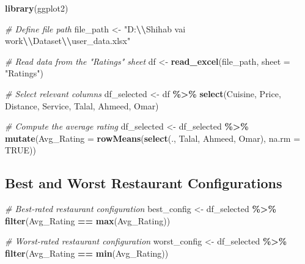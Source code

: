 \documentclass[
]{article}
\newenvironment{Shaded}{\begin{snugshade}}{\end{snugshade}}
\newcommand{\AttributeTok}[1]{\textcolor[rgb]{0.13,0.29,0.53}{#1}}
\newcommand{\CommentTok}[1]{\textcolor[rgb]{0.56,0.35,0.01}{\textit{#1}}}
\newcommand{\ConstantTok}[1]{\textcolor[rgb]{0.56,0.35,0.01}{#1}}
\newcommand{\FunctionTok}[1]{\textcolor[rgb]{0.13,0.29,0.53}{\textbf{#1}}}
\newcommand{\NormalTok}[1]{#1}
\newcommand{\OtherTok}[1]{\textcolor[rgb]{0.56,0.35,0.01}{#1}}
\newcommand{\SpecialCharTok}[1]{\textcolor[rgb]{0.81,0.36,0.00}{\textbf{#1}}}
\newcommand{\StringTok}[1]{\textcolor[rgb]{0.31,0.60,0.02}{#1}}
\begin{document}
\begin{Shaded}
\begin{Highlighting}[]
\FunctionTok{library}\NormalTok{(ggplot2)}

\CommentTok{\# Define file path}
\NormalTok{file\_path }\OtherTok{\textless{}{-}} \StringTok{"D:}\SpecialCharTok{\textbackslash{}\textbackslash{}}\StringTok{Shihab vai work}\SpecialCharTok{\textbackslash{}\textbackslash{}}\StringTok{Dataset}\SpecialCharTok{\textbackslash{}\textbackslash{}}\StringTok{user\_data.xlsx"}

\CommentTok{\# Read data from the "Ratings" sheet}
\NormalTok{df }\OtherTok{\textless{}{-}} \FunctionTok{read\_excel}\NormalTok{(file\_path, }\AttributeTok{sheet =} \StringTok{"Ratings"}\NormalTok{)}

\CommentTok{\# Select relevant columns}
\NormalTok{df\_selected }\OtherTok{\textless{}{-}}\NormalTok{ df }\SpecialCharTok{\%\textgreater{}\%} \FunctionTok{select}\NormalTok{(Cuisine, Price, Distance, Service, Talal, Ahmeed, Omar)}

\CommentTok{\# Compute the average rating}
\NormalTok{df\_selected }\OtherTok{\textless{}{-}}\NormalTok{ df\_selected }\SpecialCharTok{\%\textgreater{}\%} \FunctionTok{mutate}\NormalTok{(}\AttributeTok{Avg\_Rating =} \FunctionTok{rowMeans}\NormalTok{(}\FunctionTok{select}\NormalTok{(., Talal, Ahmeed, Omar), }\AttributeTok{na.rm =} \ConstantTok{TRUE}\NormalTok{))}
\end{Highlighting}
\end{Shaded}

\subsection{Best and Worst Restaurant
Configurations}\label{best-and-worst-restaurant-configurations}

\begin{Shaded}
\begin{Highlighting}[]
\CommentTok{\# Best{-}rated restaurant configuration}
\NormalTok{best\_config }\OtherTok{\textless{}{-}}\NormalTok{ df\_selected }\SpecialCharTok{\%\textgreater{}\%} \FunctionTok{filter}\NormalTok{(Avg\_Rating }\SpecialCharTok{==} \FunctionTok{max}\NormalTok{(Avg\_Rating))}

\CommentTok{\# Worst{-}rated restaurant configuration}
\NormalTok{worst\_config }\OtherTok{\textless{}{-}}\NormalTok{ df\_selected }\SpecialCharTok{\%\textgreater{}\%} \FunctionTok{filter}\NormalTok{(Avg\_Rating }\SpecialCharTok{==} \FunctionTok{min}\NormalTok{(Avg\_Rating))}
\end{Highlighting}
\end{Shaded}
\end{document}
